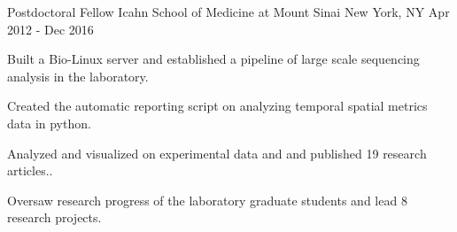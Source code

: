 \begin{cventries}
	\cventry
	{Postdoctoral Fellow} %
	{Icahn School of Medicine at Mount Sinai} %
	{New York, NY} %
	{Apr 2012 - Dec 2016} %
	{
		\begin{cvitems} %
			\item {Built a Bio-Linux server and established a pipeline of large scale sequencing analysis in the laboratory.}
			\item {Created the automatic reporting script on analyzing temporal spatial metrics data in python.}
			\item {Analyzed and visualized  on experimental data and and published 19 research articles..}
			\item {Oversaw research progress of the laboratory graduate students and lead 8 research projects.}
		\end{cvitems}
	}



\end{cventries}
